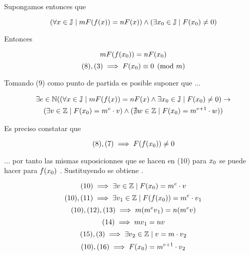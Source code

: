 \documentclass[12pt]{article}
\begin{document}
Supongamos entonces que 

\begin{equation}
	(\forall x \in \mathbb{J} \mid m F(f(x)) = n  F(x)) \land (\exists x\textsubscript{0} \in \mathbb{J} \mid F(x\textsubscript{0}) \neq 0)
\end{equation}

Entonces 

\begin{equation}
	m F(f(x\textsubscript{0})) = n F(x\textsubscript{0})
\end{equation}
\begin{equation}
	(8)  , (3) \implies F(x\textsubscript{0}) \equiv 0 \pmod{m} 
\end{equation}

Tomando (9) como punto de partida es posible suponer que ...

\begin{equation}
\begin{gathered}
	\exists e \in \mathbb{N} ((\forall x \in \mathbb{J} \mid m F(f(x)) = n  F(x) \land \exists x\textsubscript{0} \in \mathbb{J} \mid F(x\textsubscript{0}) \neq 0) \to \\
	(\exists v \in \mathbb{Z} \mid F(x\textsubscript{0}) = m^e  \cdot v) \land (\nexists w \in \mathbb{Z} \mid F(x\textsubscript{0}) = m^{e+1} \cdot w))
\end{gathered}
\end{equation}

Es preciso constatar que 

\begin{equation}
	(8), (7)  \implies F(f(x\textsubscript{0})) \neq 0
\end{equation}

... por tanto las mismas suposicionnes que se hacen en (10) para $x\textsubscript{0}$ se puede hacer para $f(x\textsubscript{0})$ . Sustituyendo se obtiene .

\begin{equation}
	(10) \implies \exists v \in \mathbb{Z} \mid F(x\textsubscript{0}) = m^e \cdot v
\end{equation}
\begin{equation}
	(10), (11) \implies \exists v\textsubscript{1} \in \mathbb{Z} \mid F(f(x\textsubscript{0})) = m^e \cdot v\textsubscript{1}
\end{equation}
\begin{equation}
	(10), (12), (13) \implies m (m^{e} v\textsubscript{1}) = n (m^{e} v)
\end{equation}
\begin{equation}
	(14) \implies m v\textsubscript{1} = n v
\end{equation}
\begin{equation}
	(15), (3) \implies \exists v\textsubscript{2} \in \mathbb{Z} \mid v = m \cdot v\textsubscript{2}
\end{equation}
\begin{equation}
	(10), (16) \implies F(x\textsubscript{0}) = m^{e+1} \cdot v\textsubscript{2}
\end{equation}
\end{document}
